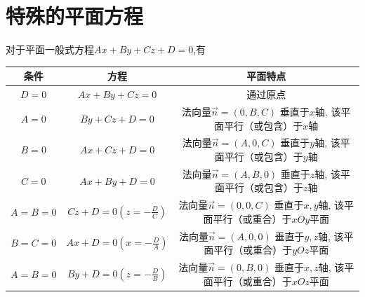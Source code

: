 \section{特殊的平面方程}
对于平面一般式方程$Ax+By+Cz+D=0$,有
\begin{center}
	\begin{tabular}{|c|c|c|}
		\hline 
		条件&方程  &平面特点  \\ 
		\hline 
		$D=0$&$Ax+By+Cz=0$  & 通过原点 \\ 
		\hline 
		$A=0$&$By+Cz+D=0$  &\makecell [c]{\hspace*{0.5cm} 法向量$\overrightarrow{n}=(0,B,C)$  垂直于$x$轴,\hspace*{0.5cm} \\ \hspace*{0.5cm} 该平面平行（或包含）于$x$轴\hspace*{0.5cm} } \\ 
		\hline 
		$B=0$&$Ax+Cz+D=0$  &\makecell [c]{\hspace*{0.5cm} 法向量$\overrightarrow{n}=(A,0,C)$  垂直于$y$轴,\hspace*{0.5cm}  \\ \hspace*{0.5cm} 该平面平行（或包含）于$y$轴\hspace*{0.5cm} } \\ 
		\hline 
		$C=0$&$Ax+By+D=0$  &\makecell [c]{\hspace*{0.5cm} 法向量$\overrightarrow{n}=(A,B,0)$  垂直于$z$轴,\hspace*{0.5cm} \\ \hspace*{0.5cm} 该平面平行（或包含）于$z$轴\hspace*{0.5cm} } \\ 
		\hline 
		$A=B=0$& $\displaystyle Cz+D=0  (z=-\frac{D}{C})$ & \makecell [c]{\hspace*{0.5cm} 法向量$\overrightarrow{n}=(0,0,C)$  垂直于$x,y$轴,\hspace*{0.5cm} \\ \hspace*{0.5cm} 该平面平行（或重合）于$xOy$平面\hspace*{0.5cm} } \\ 
		\hline 
		$B=C=0$& $\displaystyle Ax+D=0 (x=-\frac{D}{A})$ & \makecell [c]{\hspace*{0.5cm} 法向量$\overrightarrow{n}=(A,0,0)$  垂直于$y,z$轴,\hspace*{0.5cm}  \\ \hspace*{0.5cm} 该平面平行（或重合）于$yOz$平面\hspace*{0.5cm} } \\ 
		\hline 
		$A=B=0$& $\displaystyle By+D=0 (z=-\frac{D}{B})$ & \makecell [c]{\hspace*{0.5cm} 法向量$\overrightarrow{n}=(0,B,0)$  垂直于$x,z$轴,\hspace*{0.5cm} \\ \hspace*{0.5cm} 该平面平行（或重合）于$xOz$平面\hspace*{0.5cm} } \\ 
		\hline 
	\end{tabular} 
\end{center}


